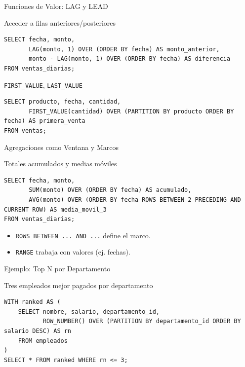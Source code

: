 \documentclass[aspectratio=169, 10pt, xcolor=table]{beamer}
\begin{document}
\begin{frame}[fragile]{Funciones de Valor: LAG y LEAD}
    \begin{block}{Acceder a filas anteriores/posteriores}
        \begin{lstlisting}
SELECT fecha, monto,
       LAG(monto, 1) OVER (ORDER BY fecha) AS monto_anterior,
       monto - LAG(monto, 1) OVER (ORDER BY fecha) AS diferencia
FROM ventas_diarias;
        \end{lstlisting}
    \end{block}
    \begin{block}{\texttt{FIRST\_VALUE}, \texttt{LAST\_VALUE}}
        \begin{lstlisting}
SELECT producto, fecha, cantidad,
       FIRST_VALUE(cantidad) OVER (PARTITION BY producto ORDER BY fecha) AS primera_venta
FROM ventas;
        \end{lstlisting}
    \end{block}
\end{frame}

\begin{frame}[fragile]{Agregaciones como Ventana y Marcos}
    \begin{block}{Totales acumulados y medias móviles}
        \begin{lstlisting}
SELECT fecha, monto,
       SUM(monto) OVER (ORDER BY fecha) AS acumulado,
       AVG(monto) OVER (ORDER BY fecha ROWS BETWEEN 2 PRECEDING AND CURRENT ROW) AS media_movil_3
FROM ventas_diarias;
        \end{lstlisting}
    \end{block}
    \begin{itemize}
        \item \texttt{ROWS BETWEEN ... AND ...} define el marco.
        \item \texttt{RANGE} trabaja con valores (ej. fechas).
    \end{itemize}
\end{frame}

\begin{frame}[fragile]{Ejemplo: Top N por Departamento}
    \begin{block}{Tres empleados mejor pagados por departamento}
        \begin{lstlisting}
WITH ranked AS (
    SELECT nombre, salario, departamento_id,
           ROW_NUMBER() OVER (PARTITION BY departamento_id ORDER BY salario DESC) AS rn
    FROM empleados
)
SELECT * FROM ranked WHERE rn <= 3;
        \end{lstlisting}
    \end{block}
\end{frame}
\end{document}
